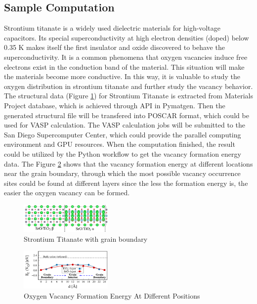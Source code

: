 \documentclass[letterpaper,12pt]{article}
\begin{document}
\subsection{Sample Computation}

Strontium titanate is a widely used dielectric materials for high-voltage capacitors. Its special superconductivity at high electron densities (doped) below 0.35 K makes itself the first insulator and oxide discovered to behave the superconductivity\cite{koonce1967superconducting}. It is a common phenomena that oxygen vacancies induce free electrons exist in the conduction band of the material\cite{kalabukhov2007effect}. This situation will make the materials become more conductive. In this way, it is valuable to study the oxygen distribution in strontium titanate and further study the vacancy behavior. The structural data (Figure \ref{sto}) for Strontium Titanate is extracted from Materials Project database, which is achieved through API in Pymatgen. Then the generated structural file will be transfered into POSCAR format, which could be used for VASP calculation. The VASP calculation jobs will be submitted to the San Diego Supercomputer Center, which could provide the parallel computing environment and GPU resources. When the computation finished, the result could be utilized by the Python workflow to get the vacancy formation energy data. The Figure \ref{sto-v} shows that the vacancy formation energy at different locations near the grain boundary, through which the most possible vacancy occurrence sites could be found at different layers since the less the formation energy is, the easier the oxygen vacancy can be formed.

\begin{figure}[ht]
\centering
\includegraphics[width=0.4\textwidth]{./images/STO}
\caption{\label{sto}Strontium Titanate with grain boundary\cite{behtash2018oxygen}}
\end{figure}

\begin{figure}[ht]
\centering
\includegraphics[width=0.4\textwidth]{./images/STO-vacancy}
\caption{\label{sto-v}Oxygen Vacancy Formation Energy At Different Positions\cite{behtash2018oxygen}}
\end{figure}
\end{document}
